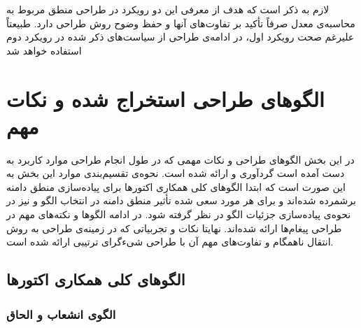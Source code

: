 لازم به ذکر است که هدف از معرفی این دو رویکرد در طراحی منطق مربوط به محاسبه‌ی معدل صرفاً تأکید بر تفاوت‌های آنها و حفظ وضوح روش طراحی دارد. طبیعتاً علیرغم صحت رویکرد اول، در ادامه‌ی طراحی از سیاست‌های ذکر شده در رویکرد دوم استفاده خواهد شد
	

\section{الگوهای طراحی استخراج شده و نکات مهم}
در این بخش الگوهای طراحی و نکات مهمی‌ که در طول انجام طراحی موارد کاربرد به دست آمده است گردآوری و ارائه شده است. نحوه‌ی تقسیم‌بندی موارد این بخش به این صورت است که ابتدا الگوهای  کلی همکاری اکتورها برای پیاده‌سازی منطق دامنه برشمرده شده‌اند و برای هر مورد سعی شده تأثیر منطق دامنه در انتخاب الگو و نیز در نحوه‌ی پیاده‌سازی جزئیات الگو در نظر گرفته شود. در ادامه الگوها و نکته‌های مهم در طراحی پیغام‌ها ارائه شده‌اند. نهایتا نکات و تجربیاتی که در زمینه‌ی طراحی به روش انتقال ناهمگام و تفاوت‌های مهم آن با طراحی شیءگرای ترتیبی ارائه شده است.
\subsection{الگوهای کلی همکاری اکتورها}
\subsubsection{الگوی انشعاب و الحاق}

